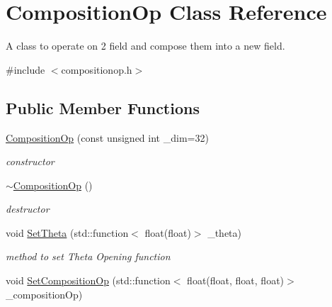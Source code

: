 \hypertarget{classCompositionOp}{}\section{Composition\+Op Class Reference}
\label{classCompositionOp}


A class to operate on 2 field and compose them into a new field.  




{\ttfamily \#include $<$compositionop.\+h$>$}

\subsection*{Public Member Functions}
\begin{DoxyCompactItemize}
\item 
\hyperlink{classCompositionOp_aca1238b25d6ab1453a3811daa017aa82}{Composition\+Op} (const unsigned int \+\_\+dim=32)\hypertarget{classCompositionOp_aca1238b25d6ab1453a3811daa017aa82}{}\label{classCompositionOp_aca1238b25d6ab1453a3811daa017aa82}

\begin{DoxyCompactList}\small\item\em constructor \end{DoxyCompactList}\item 
\hyperlink{classCompositionOp_a93fd65f54661fa7ba48bb8c78ed2a649}{$\sim$\+Composition\+Op} ()\hypertarget{classCompositionOp_a93fd65f54661fa7ba48bb8c78ed2a649}{}\label{classCompositionOp_a93fd65f54661fa7ba48bb8c78ed2a649}

\begin{DoxyCompactList}\small\item\em destructor \end{DoxyCompactList}\item 
void \hyperlink{classCompositionOp_ad02524aa790a6c765434ab45c30c8cc7}{Set\+Theta} (std\+::function$<$ float(float)$>$ \+\_\+theta)\hypertarget{classCompositionOp_ad02524aa790a6c765434ab45c30c8cc7}{}\label{classCompositionOp_ad02524aa790a6c765434ab45c30c8cc7}

\begin{DoxyCompactList}\small\item\em method to set Theta Opening function \end{DoxyCompactList}\item 
void \hyperlink{classCompositionOp_a01f25ef36a6118e8a55216a9d5db78cc}{Set\+Composition\+Op} (std\+::function$<$ float(float, float, float)$>$ \+\_\+composition\+Op)\hypertarget{classCompositionOp_a01f25ef36a6118e8a55216a9d5db78cc}{}\label{classCompositionOp_a01f25ef36a6118e8a55216a9d5db78cc}


\end{DoxyCompactItemize}
